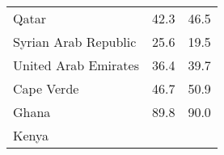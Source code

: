 \documentclass[]{book}
\begin{document}
\begin{longtable}[]{@{}lll@{}}
\begin{minipage}[t]{0.29\columnwidth}
Qatar\strut
\end{minipage} & \begin{minipage}[t]{0.10\columnwidth}\raggedright
42.3\strut
\end{minipage} & \begin{minipage}[t]{0.29\columnwidth}\raggedright
46.5\strut
\end{minipage}\tabularnewline
\begin{minipage}[t]{0.29\columnwidth}\raggedright
Syrian Arab Republic\strut
\end{minipage} & \begin{minipage}[t]{0.10\columnwidth}\raggedright
25.6\strut
\end{minipage} & \begin{minipage}[t]{0.29\columnwidth}\raggedright
19.5\strut
\end{minipage}\tabularnewline
\begin{minipage}[t]{0.29\columnwidth}\raggedright
United Arab Emirates\strut
\end{minipage} & \begin{minipage}[t]{0.10\columnwidth}\raggedright
36.4\strut
\end{minipage} & \begin{minipage}[t]{0.29\columnwidth}\raggedright
39.7\strut
\end{minipage}\tabularnewline
\begin{minipage}[t]{0.29\columnwidth}\raggedright
Cape Verde\strut
\end{minipage} & \begin{minipage}[t]{0.10\columnwidth}\raggedright
46.7\strut
\end{minipage} & \begin{minipage}[t]{0.29\columnwidth}\raggedright
50.9\strut
\end{minipage}\tabularnewline
\begin{minipage}[t]{0.29\columnwidth}\raggedright
Ghana\strut
\end{minipage} & \begin{minipage}[t]{0.10\columnwidth}\raggedright
89.8\strut
\end{minipage} & \begin{minipage}[t]{0.29\columnwidth}\raggedright
90.0\strut
\end{minipage}\tabularnewline
\begin{minipage}[t]{0.29\columnwidth}\raggedright
Kenya\strut
\end{minipage} & \begin{minipage}[t]{0.10\columnwidth}\raggedright

\end{minipage}
\end{longtable}
\end{document}
